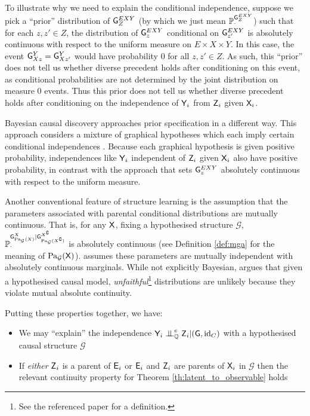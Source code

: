 To illustrate why we need to explain the conditional independence, suppose we pick a ``prior'' distribution of $\mathsf{G}^{EXY}_{Z}$ (by which we just mean $\mathbb{P}_{\cdot}^{\mathsf{G}^{EXY}_{Z}}$) such that for each $z,z'\in Z$, the distribution of $\mathsf{G}^{EXY}_z$ conditional on $\mathsf{G}^{EXY}_{z'}$ is absolutely continuous with respect to the uniform measure on $E\times X\times Y$. In this case, the event $\mathsf{G}^Y_{Xz}=\mathsf{G}^Y_{Xz'}$ would have probability 0 for all $z,z'\in Z$. As such, this ``prior'' does not tell us whether diverse precedent holds after conditioning on this event, as conditional probabilities are not determined by the joint distribution on measure 0 events. Thus this prior does not tell us whether diverse precedent holds after conditioning on the independence of $\mathsf{Y}_i$ from $\mathsf{Z}_i$ given $\mathsf{X}_i$.

Bayesian causal discovery approaches prior specification in a different way. This approach considers a mixture of graphical hypotheses which each imply certain conditional independences \citep{heckerman_learning_1995}. Because each graphical hypothesis is given positive probability, independences like $\mathsf{Y}_i$ independent of $\mathsf{Z}_i$ given $\mathsf{X}_i$ also have positive probability, in contrast with the approach that sets $\mathsf{G}^{EXY}_z$ absolutely continuous with respect to the uniform measure.

Another conventional feature of structure learning is the assumption that the parameters associated with parental conditional distributions are mutually continuous. That is, for any $\mathsf{X}$, fixing a hypothesised structure $\mathcal{G}$, $\mathbb{P}_\cdot^{\mathsf{G}^{X}_{\mathrm{Pa}_\mathcal{G}(X)}|\mathsf{G}^{X^\complement}_{\mathrm{Pa}_\mathcal{G}(X^\complement)}}$ is absolutely continuous (see Definition \ref{def:mga} for the meaning of $\mathrm{Pa}_{\mathcal{G}}(\mathsf{X})$). \citep{heckerman_learning_1995} assumes these parameters are mutually independent with absolutely continuous marginals. While not explicitly Bayesian, \citet{meek_strong_1995} argues that given a hypothesised causal model, \emph{unfaithful}\footnote{See the referenced paper for a definition.} distributions are unlikely because they violate mutual absolute continuity.

Putting these properties together, we have:
\begin{itemize}
	\item We may ``explain'' the independence $\RV{Y}_i\CI^e_{\prob{Q}} \RV{Z}_i | (\RV{G}, \mathrm{id}_C)$ with a hypothesised causal structure $\mathcal{G}$
	\item If \emph{either} $\mathsf{Z}_i$ is a parent of $\mathsf{E}_i$ or $\mathsf{E}_i$ and $\mathsf{Z}_i$ are parents of $\mathsf{X}_i$ in $\mathcal{G}$ then the relevant continuity property for Theorem \ref{th:latent_to_observable} holds
\end{itemize}

